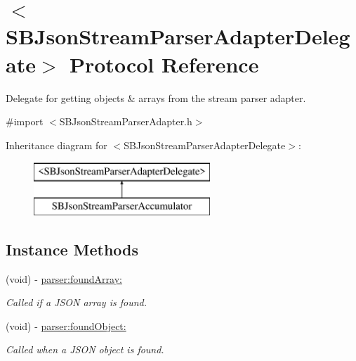 \hypertarget{protocol_s_b_json_stream_parser_adapter_delegate-p}{\section{$<$S\-B\-Json\-Stream\-Parser\-Adapter\-Delegate$>$ Protocol Reference}
\label{protocol_s_b_json_stream_parser_adapter_delegate-p}
}


Delegate for getting objects \& arrays from the stream parser adapter.  




{\ttfamily \#import $<$S\-B\-Json\-Stream\-Parser\-Adapter.\-h$>$}

Inheritance diagram for $<$S\-B\-Json\-Stream\-Parser\-Adapter\-Delegate$>$\-:\begin{figure}[H]
\begin{center}
\leavevmode
\includegraphics[height=2.000000cm]{protocol_s_b_json_stream_parser_adapter_delegate-p}
\end{center}
\end{figure}
\subsection*{Instance Methods}
\begin{DoxyCompactItemize}
\item 
(void) -\/ \hyperlink{protocol_s_b_json_stream_parser_adapter_delegate-p_acac3b4b2e4cfb45a8ca8ca945a47e326}{parser\-:found\-Array\-:}
\begin{DoxyCompactList}\small\item\em Called if a J\-S\-O\-N array is found. \end{DoxyCompactList}\item 
(void) -\/ \hyperlink{protocol_s_b_json_stream_parser_adapter_delegate-p_abefd538a1ce6d75eb3e8572a1049f597}{parser\-:found\-Object\-:}
\begin{DoxyCompactList}\small\item\em Called when a J\-S\-O\-N object is found. \end{DoxyCompactList}\end{DoxyCompactItemize}


